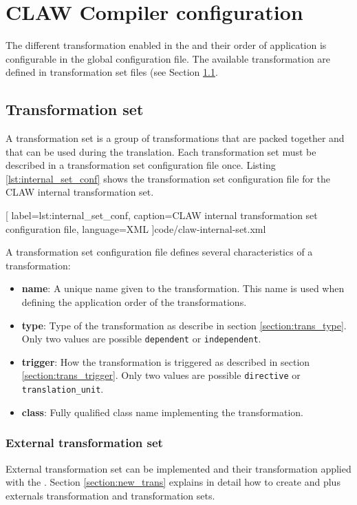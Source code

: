 \chapter{CLAW Compiler configuration}
\label{chapter:configuration}

The different transformation enabled in the \clawfcomp and their order of
application is configurable in the \clawfcomp global configuration file. The
available transformation are defined in transformation set files (see Section
\ref{section:conf_trans_set}.

\section{Transformation set}
\label{section:conf_trans_set}
A transformation set is a group of transformations that are packed together and
that can be used during the translation. Each transformation set must be
described in a transformation set configuration file once. Listing
\ref{lst:internal_set_conf} shows the transformation set configuration file for
the CLAW internal transformation set.


  [
    label=lst:internal_set_conf,
    caption=CLAW internal transformation set configuration file,
    language=XML
  ]{code/claw-internal-set.xml}

A transformation set configuration file defines several characteristics of a
transformation:
\begin{itemize}
  \item \textbf{name}: A unique name given to the transformation. This name is used when
        defining the application order of the transformations.
  \item \textbf{type}: Type of the transformation as describe in section
        \ref{section:trans_type}. Only two values are possible
        \lstinline|dependent| or \lstinline|independent|.
  \item \textbf{trigger}: How the transformation is triggered as described in section
        \ref{section:trans_trigger}. Only two values are possible
        \lstinline|directive| or \lstinline|translation_unit|.
  \item \textbf{class}: Fully qualified class name implementing the transformation.
\end{itemize}

\subsection{External transformation set}
External transformation set can be implemented and their transformation applied
with the \clawfcomp. Section \ref{section:new_trans} explains in detail how to
create and plus externals transformation and transformation sets.


